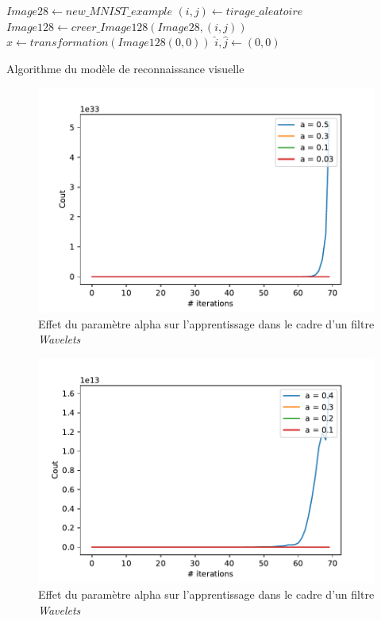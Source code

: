 \begin{algorithm}
\SetAlgoLined
$Image28 \leftarrow new\_MNIST\_example$\;
$(i,j) \leftarrow tirage\_aleatoire$\;
$Image128 \leftarrow creer\_Image128(Image28,(i,j))$\;
$x \leftarrow transformation(Image128(0,0))$\;
$\hat{i},\hat{j} \leftarrow (0,0)$\;
\caption{Algorithme du modèle de reconnaissance visuelle\label{Algo}}
\end{algorithm}


\begin{figure}[th]
\centering
\includegraphics{Figures/Benchmarking_para_alpha_2}
\decoRule %
\caption[Figure]{Effet du paramètre alpha sur l'apprentissage dans le cadre d'un filtre \textit{Wavelets}}
\label{fig:benchmark_surApp1}
\end{figure}

\begin{figure}[th]
\centering
\includegraphics{Figures/Benchmarking_para_alpha_3}
\decoRule %
\caption[Figure]{Effet du paramètre alpha sur l'apprentissage dans le cadre d'un filtre \textit{Wavelets}}
\label{fig:benchmark_surApp2}
\end{figure}

